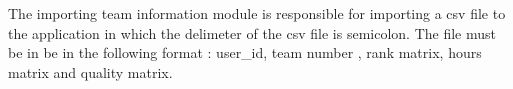 The importing team information module is responsible for importing a csv file to the application in which the delimeter of the csv file is semicolon. The file must be in be in the following format : user_id, team number , rank matrix, hours matrix and quality matrix. 
